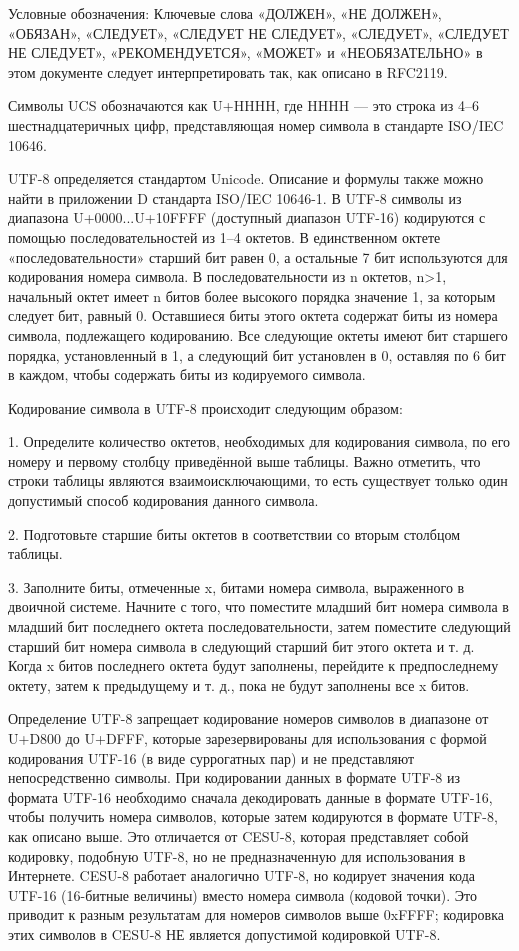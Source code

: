 \documentclass{ou}
\begin{document}
Условные обозначения: Ключевые слова «ДОЛЖЕН», «НЕ ДОЛЖЕН», «ОБЯЗАН», «СЛЕДУЕТ», «СЛЕДУЕТ НЕ СЛЕДУЕТ», «СЛЕДУЕТ», «СЛЕДУЕТ НЕ СЛЕДУЕТ», «РЕКОМЕНДУЕТСЯ», «МОЖЕТ» и «НЕОБЯЗАТЕЛЬНО» в этом документе следует интерпретировать так, как описано в RFC2119.

 Символы UCS обозначаются как U+HHHH, где HHHH — это строка из 4--6 шестнадцатеричных цифр, представляющая номер символа в стандарте ISO/IEC 10646.
 
UTF-8 определяется стандартом Unicode. Описание и формулы также можно найти в приложении D стандарта ISO/IEC 10646-1. В UTF-8 символы из диапазона U+0000...U+10FFFF (доступный диапазон UTF-16) кодируются с помощью последовательностей из 1--4 октетов. В единственном октете «последовательности» старший бит равен 0, а остальные 7 бит используются для кодирования номера символа. В последовательности из n октетов, n>1, начальный октет имеет n битов более высокого порядка значение 1, за которым следует бит, равный 0. Оставшиеся биты этого октета содержат биты из номера символа, подлежащего кодированию. Все следующие октеты имеют бит старшего порядка, установленный в 1, а следующий бит установлен в 0, оставляя по 6 бит в каждом, чтобы содержать биты из кодируемого символа.

Кодирование символа в UTF-8 происходит следующим образом:

 1. Определите количество октетов, необходимых для кодирования символа, по его номеру и первому столбцу приведённой выше таблицы. Важно отметить, что строки таблицы являются взаимоисключающими, то есть существует только один допустимый способ кодирования данного символа.
 
 2. Подготовьте старшие биты октетов в соответствии со вторым столбцом таблицы. 
 
 3. Заполните биты, отмеченные x, битами номера символа, выраженного в двоичной системе. Начните с того, что поместите младший бит номера символа в младший бит последнего октета последовательности, затем поместите следующий старший бит номера символа в следующий старший бит этого октета и т. д. Когда x битов последнего октета будут заполнены, перейдите к предпоследнему октету, затем к предыдущему и т. д., пока не будут заполнены все x битов. 
 
Определение UTF-8 запрещает кодирование номеров символов в диапазоне от U+D800 до U+DFFF, которые зарезервированы для использования с формой кодирования UTF-16 (в виде суррогатных пар) и не представляют непосредственно символы. При кодировании данных в формате UTF-8 из формата UTF-16 необходимо сначала декодировать данные в формате UTF-16, чтобы получить номера символов, которые затем кодируются в формате UTF-8, как описано выше. Это отличается от CESU-8, которая представляет собой кодировку, подобную UTF-8, но не предназначенную для использования в Интернете. CESU-8 работает аналогично UTF-8, но кодирует значения кода UTF-16 (16-битные величины) вместо номера символа (кодовой точки). Это приводит к разным результатам для номеров символов выше 0xFFFF; кодировка этих символов в CESU-8 НЕ является допустимой кодировкой UTF-8.
\end{document}
